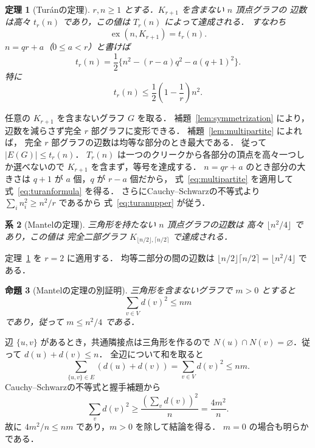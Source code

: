 \documentclass[a5paper,10pt,onecolumn]{jsarticle}
\makeatletter
\theoremstyle{mathnotetheorem}
\newtheorem{theorem}{定理}[section]
\newtheorem{proposition}[theorem]{命題}
\newtheorem{corollary}[theorem]{系}
\renewcommand{\proofname}{証明}
\renewenvironment{proof}[1][\proofname]{%
  \par\pushQED{\qed}\normalfont\topsep4\p@\@plus2\p@\relax
  \trivlist\item[\hskip\labelsep\bfseries #1]\ignorespaces
}{\popQED\endtrivlist\@endpefalse}
\makeatother
\begin{document}
\begin{theorem}[Tur\'anの定理]\label{thm:turan}
$r,n\ge1$ とする．$K_{r+1}$ を含まない $n$ 頂点グラフの
辺数は高々 $t_r(n)$ であり，この値は $T_r(n)$ によって達成される．
すなわち
\[
 \operatorname{ex}(n,K_{r+1})=t_r(n).
\]
$n=qr+a$（$0\le a<r$）と書けば
\begin{equation}\label{eq:turanformula}
 t_r(n)=\frac12\{n^2-(r-a)q^2-a(q+1)^2\}.
\end{equation}
特に
\begin{equation}\label{eq:turanupper}
 t_r(n)\le\frac12\left(1-\frac1r\right)n^2.
\end{equation}
\end{theorem}
\begin{proof}
任意の $K_{r+1}$ を含まないグラフ $G$ を取る．
補題~\ref{lem:symmetrization} により，
辺数を減らさず完全 $r$ 部グラフに変形できる．
補題~\ref{lem:multipartite} によれば，
完全 $r$ 部グラフの辺数は均等な部分のとき最大である．
従って $|E(G)|\le t_r(n)$．
$T_r(n)$ は一つのクリークから各部分の頂点を高々一つしか選べないので
$K_{r+1}$ を含まず，等号を達成する．
$n=qr+a$ のとき部分の大きさは
$q+1$ が $a$ 個，$q$ が $r-a$ 個だから，
式~\eqref{eq:multipartite} を適用して式~\eqref{eq:turanformula} を得る．
さらにCauchy--Schwarzの不等式より
$\sum_i n_i^2\ge n^2/r$ であるから
式~\eqref{eq:turanupper} が従う．
\end{proof}

\begin{corollary}[Mantelの定理]\label{cor:mantel}
三角形を持たない $n$ 頂点グラフの辺数は
高々 $\lfloor n^2/4\rfloor$ であり，この値は
完全二部グラフ $K_{\lfloor n/2\rfloor,\lceil n/2\rceil}$ で達成される．
\end{corollary}
\begin{proof}
定理~\ref{thm:turan} を $r=2$ に適用する．
均等二部分の間の辺数は
$\lfloor n/2\rfloor\lceil n/2\rceil=\lfloor n^2/4\rfloor$ である．
\end{proof}

\begin{proposition}[Mantelの定理の別証明]
三角形を含まないグラフで $m>0$ とすると
\[
 \sum_{v\in V}d(v)^2\le nm
\]
であり，従って $m\le n^2/4$ である．
\end{proposition}
\begin{proof}
辺 $\{u,v\}$ があるとき，共通隣接点は三角形を作るので
$N(u)\cap N(v)=\varnothing$．従って $d(u)+d(v)\le n$．
全辺について和を取ると
\[
 \sum_{\{u,v\}\in E}(d(u)+d(v))
 =\sum_{v\in V}d(v)^2\le nm.
\]
Cauchy--Schwarzの不等式と握手補題から
\[
 \sum_vd(v)^2\ge\frac{(\sum_vd(v))^2}{n}
 =\frac{4m^2}{n}.
\]
故に $4m^2/n\le nm$ であり，$m>0$ を除して結論を得る．
$m=0$ の場合も明らかである．
\end{proof}
\end{document}
